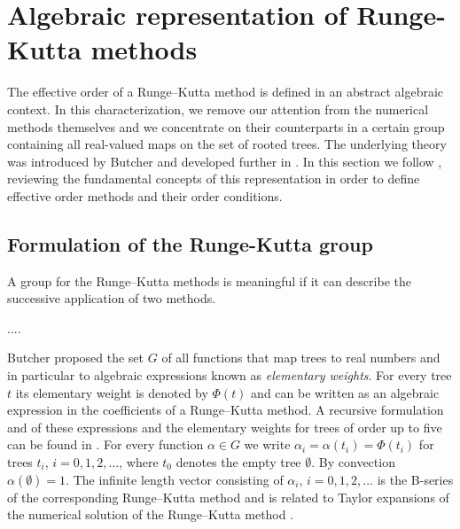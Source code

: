 \section{Algebraic representation of Runge-Kutta methods}\label{sec:Algebraic_RK}

The effective order of a Runge--Kutta method is defined in an abstract algebraic context.
In this characterization, we remove our attention from the numerical methods themselves and we concentrate on their counterparts in a certain group containing all real-valued maps on the set of rooted trees.
The underlying theory was introduced by Butcher \cite{Butcher1969} and developed further in \cite{Butcher1972, Hairer1974, Butcher1996, Butcher1998}.
In this section we follow \cite{Butcher2008_book}, reviewing the fundamental concepts of this representation in order to define effective order methods and their order conditions.

\subsection{Formulation of the Runge-Kutta group}\label{sec:RK_group}

A group for the Runge--Kutta methods is meaningful if it can describe the successive application of two methods.

....


Butcher \cite{Butcher1972} proposed the set $G$ of all functions that map trees to real numbers and in particular to algebraic expressions known as \emph{elementary weights}.
For every tree $t$ its elementary weight is denoted by $\Phi(t)$ and can be written as an algebraic expression in the coefficients of a Runge--Kutta method.  A recursive formulation and of these expressions and the elementary weights for trees of order up to five can be found in \cite[Definition and Tables~3.12]{Butcher2008_book}.
For every function $\alpha \in G$ we write $\alpha_{i} = \alpha(t_{i}) = \Phi(t_{i})$ for trees $t_{i}$, $i = 0, 1, 2, \dots$, where $t_{0}$ denotes the empty tree $\emptyset$. By convection $\alpha(\emptyset) = 1$. The infinite length vector consisting of $\alpha_i$, $i = 0, 1, 2, \ldots$ is the B-series of the corresponding Runge--Kutta method and is related to Taylor expansions of the numerical solution of the Runge--Kutta method \cite{Hairer1974, Butcher2008_book}.

